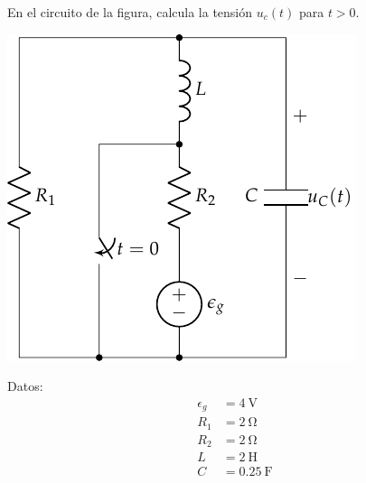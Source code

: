 \documentclass[12pt]{article}
\begin{document}
En el circuito de la figura, calcula la tensión $u_c(t)$ para $t > 0$.

\vspace*{1cm}

\begin{minipage}{0.7\textwidth}
  \includegraphics[scale=0.8]{figs/FM_4_9}
\end{minipage}
\hfill
\begin{minipage}{0.3\textwidth}
Datos:
\begin{align*}
  \epsilon_g &= \SI{4}{\volt}\\
  R_1 &= \SI{2}{\ohm}\\
  R_2 &= \SI{2}{\ohm}\\
  L &= \SI{2}{\henry}\\
  C &= \SI{0.25}{\farad}      
\end{align*}
\end{minipage}
\end{document}
